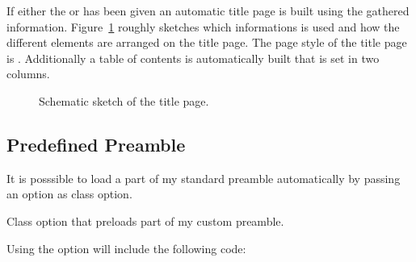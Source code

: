 \documentclass[load-preamble]{cnltx-doc}
\begin{document}
If either the  or  has been given an automatic
title page is built using the gathered information. Figure~\ref{fig:titlepage}
roughly sketches which informations is used and how the different elements are
arranged on the title page.  The page style of the title page is
.  Additionally a  table of contents is automatically built that
is set in two columns.

\begin{figure}[htb]
  \centering
  \caption{Schematic sketch of the title page.}
  \label{fig:titlepage}
\end{figure}

\subsection{Predefined Preamble}\label{sec:preamble}

It is posssible to load a part of my standard preamble automatically by
passing an option as class option.
\begin{options}
    Class option that preloads part of my custom preamble.
\end{options}

Using the option will include the following code:

\begin{sourcecode}
  \RequirePackage[oldstyle]{libertine}
  \RequirePackage{libertinehologopatch}%
  \RequirePackage[supstfm=libertinesups]{superiors}
  \RequirePackage{microtype}
  \RequirePackage[scaled=.83]{beramono}
  \RequirePackage{fnpct}
  \RequirePackage[english]{babel}
  \renewcommand*\othersectionlevelsformat[3]{%
    \textcolor{cnltx}{#3\autodot}\enskip}
  \renewcommand*\partformat{%
    \textcolor{cnltx}{\partname~\thepart\autodot}}
  \pagestyle{headings}
  \setcapindent{1.5em}
\end{sourcecode}
\end{document}
